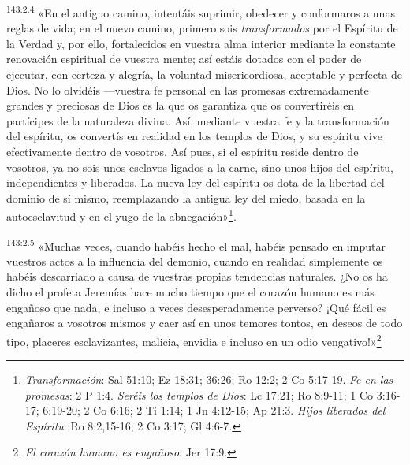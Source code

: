 \par
\textsuperscript{143:2.4} «En el antiguo camino, intentáis suprimir, obedecer y conformaros a unas reglas de vida; en el nuevo camino, primero sois \textit{transformados} por el Espíritu de la Verdad y, por ello, fortalecidos en vuestra alma interior mediante la constante renovación espiritual de vuestra mente; así estáis dotados con el poder de ejecutar, con certeza y alegría, la voluntad misericordiosa, aceptable y perfecta de Dios. No lo olvidéis ---vuestra fe personal en las promesas extremadamente grandes y preciosas de Dios es la que os garantiza que os convertiréis en partícipes de la naturaleza divina. Así, mediante vuestra fe y la transformación del espíritu, os convertís en realidad en los templos de Dios, y su espíritu vive efectivamente dentro de vosotros. Así pues, si el espíritu reside dentro de vosotros, ya no sois unos esclavos ligados a la carne, sino unos hijos del espíritu, independientes y liberados. La nueva ley del espíritu os dota de la libertad del dominio de sí mismo, reemplazando la antigua ley del miedo, basada en la autoesclavitud y en el yugo de la abnegación»\footnote{\textit{Transformación}: Sal 51:10; Ez 18:31; 36:26; Ro 12:2; 2 Co 5:17-19. \textit{Fe en las promesas}: 2 P 1:4. \textit{Seréis los templos de Dios}: Lc 17:21; Ro 8:9-11; 1 Co 3:16-17; 6:19-20; 2 Co 6:16; 2 Ti 1:14; 1 Jn 4:12-15; Ap 21:3. \textit{Hijos liberados del Espíritu}: Ro 8:2,15-16; 2 Co 3:17; Gl 4:6-7.}.

\par
\textsuperscript{143:2.5} «Muchas veces, cuando habéis hecho el mal, habéis pensado en imputar vuestros actos a la influencia del demonio, cuando en realidad simplemente os habéis descarriado a causa de vuestras propias tendencias naturales. ¿No os ha dicho el profeta Jeremías hace mucho tiempo que el corazón humano es más engañoso que nada, e incluso a veces desesperadamente perverso? ¡Qué fácil es engañaros a vosotros mismos y caer así en unos temores tontos, en deseos de todo tipo, placeres esclavizantes, malicia, envidia e incluso en un odio vengativo!»\footnote{\textit{El corazón humano es engañoso}: Jer 17:9.}

